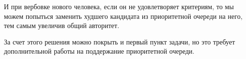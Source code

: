 \begin{enumerate}
\begin{enumerate}
        И при вербовке нового человека, если он не удовлетворяет критериям, то мы можем попыться заменить
        худшего кандидата из приоритетной очереди на него, тем самым увеличив общий авторитет.

        За счет этого решения можно покрыть и первый пункт задачи, но это требует дополнительной работы на поддержание
        приоритетной очереди.

    \end{enumerate}

\end{enumerate}
